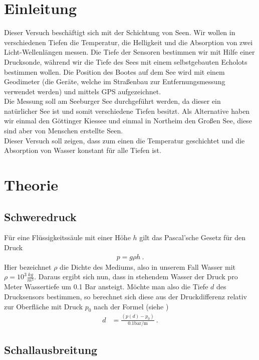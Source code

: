 \documentclass[12pt,a4paper,titlepage,headinclude,bibtotoc]{scrartcl}
\numberwithin{equation}{subsection}
\begin{document}
\setcounter{footnote}{0}
\setcounter{page}{1}

\section{Einleitung}
\label{sec:einleitung}
Dieser Versuch beschäftigt sich mit der Schichtung von Seen.
Wir wollen in verschiedenen Tiefen die Temperatur, die Helligkeit und die Absorption von zwei Licht-Wellenlängen messen.
Die Tiefe der Sensoren bestimmen wir mit Hilfe einer Drucksonde, während wir die Tiefe des Sees mit einem selbstgebauten Echolots bestimmen wollen.
Die Position des Bootes auf dem See wird mit einem Geodimeter (die Geräte, welche im Straßenbau zur Entfernungsmessung verwendet werden) und mittels GPS aufgezeichnet.\\
Die Messung soll am Seeburger See durchgeführt werden, da dieser ein natürlicher See ist und somit verschiedene Tiefen besitzt.
Als Alternative haben wir einmal den Göttinger Kiessee und einmal in Northeim den Großen See, diese sind aber von Menschen erstellte Seen.\\
Dieser Versuch soll zeigen, dass zum einen die Temperatur geschichtet und die Absorption von Wasser konstant für alle Tiefen ist.


\section{Theorie}
\label{sec:theorie}
\subsection{Schweredruck}

Für eine Flüssigkeitssäule mit einer Höhe $h$ gilt das Pascal'sche Gesetz für den Druck
\begin{align}
 p= g \rho h~.
\end{align}
Hier bezeichnet $\rho$ die Dichte des Mediums, also in unserem Fall Wasser mit $\rho = 10^3 \frac{kg}{m^3}$. Daraus ergibt sich nun, dass in stehendem Wasser der Druck pro Meter Wassertiefe um 0.1 Bar ansteigt.
Möchte man also die Tiefe $d$ des Drucksensors bestimmen, so berechnet sich diese aus der Druckdifferenz relativ zur Oberfläche mit Druck $p_0$ nach der Formel (siehe \cite[S.118]{gerthsen})
\begin{align}
	d&=\frac{(p(d)-p_0)}{0.1\si{\bar \per\metre}}~. \label{eq:d}
\end{align}

\subsection{Schallausbreitung}
\end{document}
